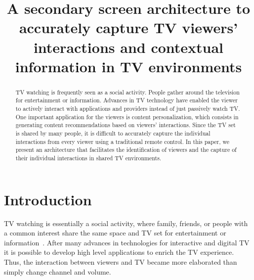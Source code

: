 \documentclass[conference,a4paper]{IEEEtran}
\begin{document}
\title{A secondary screen architecture to accurately capture TV viewers' interactions and contextual information in TV environments}

\author{
\and
{}
}
\maketitle

\begin{abstract}
TV watching is frequently seen as a social activity. People gather around the television for entertainment or information. Advances in TV technology have enabled the viewer to actively interact with applications and providers instead of just passively watch TV. One important application for the viewers is content personalization, which consists in generating content recommendations based on viewers' interactions. Since the TV set is shared by many people, it is difficult to accurately capture the individual interactions from every viewer using a traditional remote control. In this paper, we present an architecture that facilitates the identification of viewers and the capture of their individual interactions in shared TV environments.
\end{abstract}

\IEEEpeerreviewmaketitle

\section{Introduction}

TV watching is essentially a social activity, where family, friends, or people with a common interest share the same space and TV set for entertainment or information~\cite{Masthoff2004}. After many advances in technologies for interactive and digital TV it is possible to develop high level applications to enrich the TV experience. Thus, the interaction between viewers and TV became more elaborated than simply change channel and volume.
\end{document}
